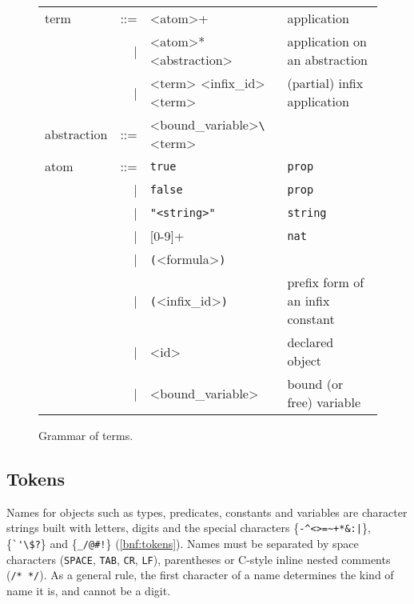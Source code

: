 \begin{figure}
  \centering
  \begin{tabular}{lrll}
    term        &::=& <atom>+                   & application \\
                & | & <atom>* <abstraction>     & application on an
                                                  abstraction \\
                & | & <term> <infix\_id> <term> & (partial) infix
                                                  application \\
    abstraction &::=& <bound\_variable>\lstinline!\! <term> & \\
    atom        &::=& \lstinline!true!          & \lstinline!prop! \\
                & | & \lstinline!false!         & \lstinline!prop! \\
                & | & \lstinline!"<string>"!    & \lstinline!string! \\
                & | & [0-9]+                    & \lstinline!nat! \\
                & | & \lstinline!(!<formula>\lstinline!)!   & \\
                & | & \lstinline!(!<infix\_id>\lstinline!)! & prefix
                                                  form of an infix
                                                  constant\\
                & | & <id>                      & declared object \\
                & | & <bound\_variable>         & bound (or free)
                                                  variable \\
  \end{tabular}
  \caption{Grammar of terms.\label{bnf:terms}}
\end{figure}

\subsection{Tokens}

Names for objects such as types, predicates, constants and variables are
character strings built with letters, digits and the special characters
\{\lstinline{-^<>=~+*&:|}\}, \{\lstinline{`'\$?}\} and
\{\lstinline{_/@#!}\}
(\autoref{bnf:tokens}).  Names must
be separated by space characters (\texttt{SPACE}, \texttt{TAB},
\texttt{CR}, \texttt{LF}), parentheses or C-style inline nested comments
(\lstinline{/* */}).  As a general rule, the first character of a name
determines the kind of name it is, and cannot be a digit.


